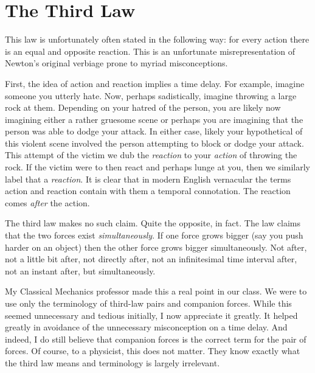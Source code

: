 \documentclass[12pt, letterpaper, openany]{article}
\begin{document}
\section{The Third Law}

This law is unfortunately often stated in the following way: for every action there is an equal and opposite reaction. This is an unfortunate misrepresentation of Newton's original verbiage prone to myriad misconceptions.

First, the idea of action and reaction implies a time delay. For example, imagine someone you utterly hate. Now, perhaps sadistically, imagine throwing a large rock at them. Depending on your hatred of the person, you are likely now imagining either a rather gruesome scene or perhaps you are imagining that the person was able to dodge your attack. In either case, likely your hypothetical of this violent scene involved the person attempting to block or dodge your attack. This attempt of the victim we dub the \emph{reaction} to your \emph{action} of throwing the rock. If the victim were to then react and perhaps lunge at you, then we similarly label that a \emph{reaction}. It is clear that in modern English vernacular the terms action and reaction contain with them a temporal connotation. The reaction comes \emph{after} the action.

The third law makes no such claim. Quite the opposite, in fact. The law claims that the two forces exist \emph{simultaneously}. If one force grows bigger (say you push harder on an object) then the other force grows bigger simultaneously. Not after, not a little bit after, not directly after, not an infinitesimal time interval after, not an instant after, but simultaneously.

My Classical Mechanics professor made this a real point in our class. We were to use only the terminology of third-law pairs and companion forces. While this seemed unnecessary and tedious initially, I now appreciate it greatly. It helped greatly in avoidance of the unnecessary misconception on a time delay. And indeed, I do still believe that companion forces is the correct term for the pair of forces. Of course, to a physicist, this does not matter. They know exactly what the third law means and terminology is largely irrelevant.
\end{document}
